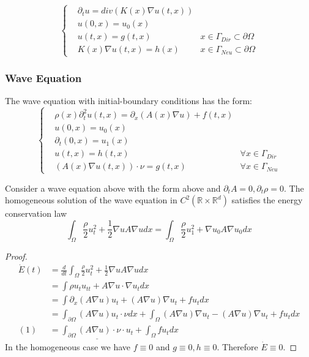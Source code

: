 \begin{equation}\label{HE_Neu}
	\left\{
	\begin{aligned}
		&\partial_t u = div(K(x) \nabla u(t, x))\\
		&u(0, x) = u_0(x)\\
		&u(t, x) = g(t, x) \quad &x \in \Gamma_{Dir}\subset \partial \Omega\\
		&K(x) \nabla u(t, x) = h(x) \quad &x \in \Gamma_{Neu} \subset \partial \Omega
	\end{aligned}
	\right.
\end{equation}

\subsubsection*{Wave Equation}
The wave equation with initial-boundary conditions has the form:
\begin{equation}
\left\{
	\begin{aligned}
		&\rho(x)\partial^2_t u(t, x) = \partial_x (A(x) \nabla u) + f(t, x)\\
		&u(0, x) = u_0(x)\\
		&\partial_t(0,x) = u_1(x)\\
		& u(t, x) = h(t, x) \quad &\forall x \in \Gamma_{Dir}\\
		& (A(x) \nabla u(t, x)) \cdot \nu = g(t, x) \quad &\forall x \in \Gamma_{Neu} 
	\end{aligned}
\right.
\end{equation}
\begin{theorem}
	Consider a wave equation above with the form above and $\partial_t A = 0, \partial_t \rho = 0$. The homogeneous solution of the wave equation in $C^2(\mathbb{R} \times \mathbb{R}^d)$ satisfies the energy conservation law
	\begin{equation}
		\int_\Omega \frac{\rho}{2}u_t^2 + \frac{1}{2}\nabla u A \nabla u dx = \int_\Omega \frac{\rho}{2} u_1^2 + \nabla u_0 A \nabla u_0 dx 
	\end{equation}
\end{theorem}
\begin{proof}
	\begin{align*}
		\dot{E}(t) &= \frac{d}{dt} \int_\Omega \frac{\rho}{2} u_t^2 + \frac{1}{2} \nabla u A \nabla u dx\\
		&= \int \rho u_t u_{tt} + A \nabla u \cdot \nabla u_t dx\\
		&= \int \partial_x (A \nabla u) u_t + (A\nabla u) \nabla u_t + f u_t dx\\
		&= \int_{\partial \Omega} (A \nabla u) u_t \cdot \nu dx + \int_\Omega (A \nabla u) \nabla u_t - (A \nabla u) \nabla u_t + f u_t dx\\
	 (1)&= \underline{ \int_{\partial \Omega} (A \nabla u) \cdot \nu \cdot u_t} + \int_\Omega f u_t  dx
	\end{align*}
	In the homogeneous case we have $f\equiv 0$ and $g \equiv 0, h \equiv 0$. Therefore $\dot{E} \equiv 0$.
\end{proof}
